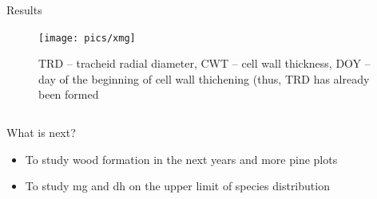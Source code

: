 \documentclass[final]{beamer}
\newlength{\sepwidth}
\newlength{\colwidth}
\newcommand{\separatorcolumn}{\begin{column}{\sepwidth}\end{column}}
\begin{document}
\begin{frame}[t]
\begin{columns}[t]
\begin{column}{\colwidth}
\begin{block}{Results}
            \begin{figure}
                \centering \texttt{[image: pics/xmg]}
                \caption{TRD -- tracheid radial diameter, CWT -- cell wall thickness, DOY -- day of the beginning of cell wall thichening (thus, TRD has already been formed}
            \end{figure}
    \end{block}

	\end{column}

\end{columns}

\begin{columns}[c]
    \begin{column}{.96\paperwidth}

    \begin{block}{What is next?}
        \raggedleft
        \begin{itemize}
            \item To study wood formation in the next years and more pine plots
            \item To study mg and dh on the upper limit of species distribution
        \end{itemize}
    \end{block}
\end{column}

\separatorcolumn

\end{columns}
\end{frame}
\end{document}
